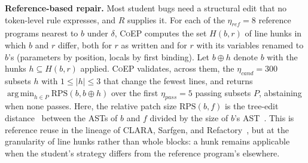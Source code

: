 \documentclass[acmsmall,screen,review,anonymous,nonacm]{acmart}
\DeclareMathOperator*{\argmin}{arg\,min}
\newcommand{\tool}{\textsc{CoEP}\xspace}
\newcommand{\V}[1]{\ensuremath{\mathit{#1}}}
\newcommand{\RPS}{\mathrm{RPS}}
\begin{document}
\textbf{Reference-based repair.} Most student bugs need a structural edit that no token-level rule expresses, and $R$ supplies it. For each of the $\eta_{\V{ref}} = 8$ reference programs nearest to $b$ under $\delta$, \tool computes the set $H(b, r)$ of line hunks in which $b$ and $r$ differ, both for $r$ as written and for $r$ with its variables renamed to $b$'s (parameters by position, locals by first binding). Let $b \oplus h$ denote $b$ with the hunks $h \subseteq H(b, r)$ applied. \tool validates, across them, the $\eta_{\V{cand}} = 300$ subsets $h$ with $1 \le |h| \le 3$ that change the fewest lines, and returns $\argmin_{h \in P} \RPS(b, b \oplus h)$ over the first $\eta_{\V{pass}} = 5$ passing subsets $P$, abstaining when none passes. Here, the relative patch size $\RPS(b, f)$ is the tree-edit distance~\cite{zhang1989simple} between the ASTs of $b$ and $f$ divided by the size of $b$'s AST~\cite{hu2019re}. This is reference reuse in the lineage of CLARA, Sarfgen, and Refactory~\cite{gulwani2018automated,wang2018search,hu2019re}, but at the granularity of line hunks rather than whole blocks: a hunk remains applicable when the student's strategy differs from the reference program's elsewhere.
\end{document}
